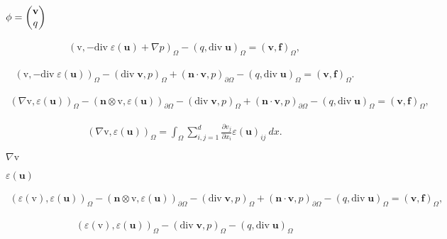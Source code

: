 \documentclass{article}
\begin{document}
$\phi = \begin{pmatrix}\textbf v \\ q\end{pmatrix}$
\pagebreak

\begin{eqnarray*} (\mathrm v, -\textrm{div}\; \varepsilon(\textbf{u}) + \nabla p)_{\Omega} - (q,\textrm{div}\; \textbf{u})_{\Omega} = (\textbf{v}, \textbf{f})_\Omega, \end{eqnarray*}
\pagebreak

\begin{eqnarray*} (\mathrm v, -\textrm{div}\; \varepsilon(\textbf{u}))_{\Omega} - (\textrm{div}\; \textbf{v}, p)_{\Omega} + (\textbf{n}\cdot\textbf{v}, p)_{\partial\Omega} - (q,\textrm{div}\; \textbf{u})_{\Omega} = (\textbf{v}, \textbf{f})_\Omega. \end{eqnarray*}
\pagebreak

\begin{eqnarray*} (\nabla \mathrm v,\varepsilon(\textbf{u}))_{\Omega} - (\textbf{n} \otimes \mathrm v,\varepsilon(\textbf{u}))_{\partial\Omega} - (\textrm{div}\; \textbf{v}, p)_{\Omega} + (\textbf{n}\cdot\textbf{v}, p)_{\partial\Omega} - (q,\textrm{div}\; \textbf{u})_{\Omega} = (\textbf{v}, \textbf{f})_\Omega, \end{eqnarray*}
\pagebreak

\begin{eqnarray*} (\nabla \mathrm v,\varepsilon(\textbf{u}))_{\Omega} = \int_\Omega \sum_{i,j=1}^d \frac{\partial v_j}{\partial x_i} \varepsilon(\textbf{u})_{ij} \ dx. \end{eqnarray*}
\pagebreak

$\nabla\mathrm v$
\pagebreak

$\varepsilon(\textbf{u})$
\pagebreak

\begin{eqnarray*} (\varepsilon(\mathrm v),\varepsilon(\textbf{u}))_{\Omega} - (\textbf{n} \otimes \mathrm v,\varepsilon(\textbf{u}))_{\partial\Omega} - (\textrm{div}\; \textbf{v}, p)_{\Omega} + (\textbf{n}\cdot\textbf{v}, p)_{\partial\Omega} - (q,\textrm{div}\; \textbf{u})_{\Omega} = (\textbf{v}, \textbf{f})_\Omega, \end{eqnarray*}
\pagebreak

\begin{eqnarray*} (\varepsilon(\mathrm v),\varepsilon(\textbf{u}))_{\Omega} - (\textrm{div}\; \textbf{v}, p)_{\Omega} - (q,\textrm{div}\; \textbf{u})_{\Omega} \end{eqnarray*}
\pagebreak
\end{document}
